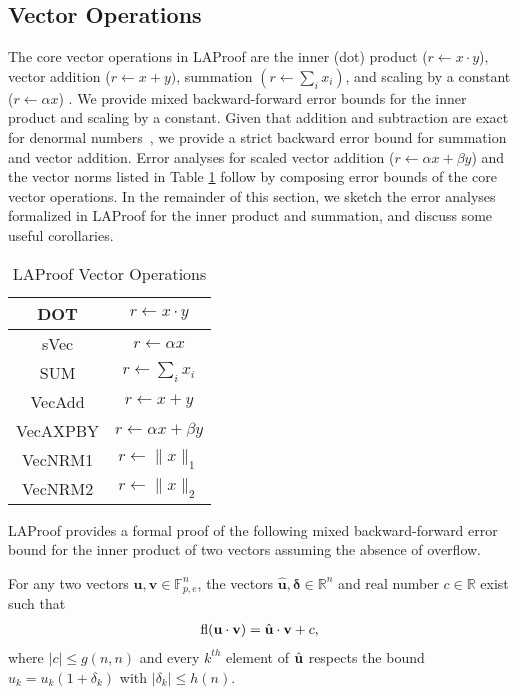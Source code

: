 \subsection{Vector Operations}
The core vector operations in LAProof are the inner
(dot) product ($r \leftarrow x \cdot y$), vector addition ($r\leftarrow  x +  y )$,  summation $(r \leftarrow
\sum_{i} x_i)$, and scaling by a constant ($r \leftarrow \alpha x$) . We provide mixed backward-forward error bounds
for the inner product and scaling by a constant. Given that
addition and subtraction are exact for denormal numbers~\cite{hauser96}, we provide a strict backward error bound for summation and  vector addition. Error analyses for scaled vector addition ($r \leftarrow \alpha x  + \beta y$) and the vector norms listed in Table \ref{tab:vecops} follow by composing error bounds of the core vector operations. In the remainder of this section, we sketch the error analyses  formalized in LAProof for the inner product and summation, and discuss some useful corollaries.

\begin{table}[htbp]
\caption{LAProof Vector Operations}
\label{tab:vecops}
\begin{center}
\setlength{\tabcolsep}{0.5em} %
{\renewcommand{\arraystretch}{1.4}%
\begin{tabular}{|c|c|}
\hline
     DOT & $r \leftarrow x \cdot  y$   \\
\hline
     sVec & $r \leftarrow \alpha x$  \\
\hline
     SUM & $ r \leftarrow \sum_{i} x_i $   \\
\hline
     VecAdd & $r \leftarrow  x + y$  \\
\hline
\hline
     VecAXPBY & $r \leftarrow \alpha x + \beta y$  \\
\hline
     VecNRM1 & $r \leftarrow \|x\|_1$   \\ 
     VecNRM2 &  $r \leftarrow \|x\|_2 $   \\ 
     \hline
     \end{tabular} }
\end{center}
\end{table}


LAProof provides a formal proof of the following mixed backward-forward error bound for
the inner product of two vectors assuming the absence of
overflow.

\begin{theorem} For any two vectors
${\textbf{u}}, {\textbf{v}} \in \mathbb{F}_{p,e}^n$,
the vectors $\hat{\textbf{u}}, \boldsymbol{\delta} \in
\mathbb{R}^n$ and real number $c \in
\mathbb{R}$ exist such that
\begin{align}\fl({\textbf{u}} \cdot {\textbf{v}}) =
\hat{\textbf{u}} \cdot \textbf{v} + {{c}} ,\label{eq:bfDOT}
\end{align} 
where $|c| \le
g (n,n)$ and every $k^{th}$ element of $\hat{\textbf{u}}$ respects
the bound $ {\hat{u}}_k= u_k(1 + \delta_k)$ with $|\delta_k| \le
h(n)$.
\label{thm:bfDOT}
\end{theorem}

